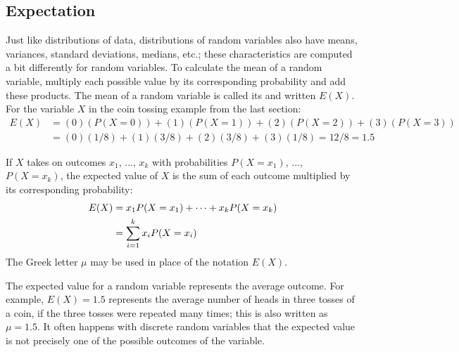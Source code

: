 \subsection{Expectation}


Just like distributions of data, distributions of random variables also have means, variances, standard deviations, medians, etc.; these characteristics are computed a bit differently for random variables. To calculate the mean of a random variable, multiply each possible value by its corresponding probability and add these products. The mean of a random variable is called its  and written $E(X)$. For the variable $X$ in the coin tossing example from the last section:
\vspace{0mm}
\begin{align*}
E(X) &= (0)(P(X=0)) + (1)(P(X=1)) + (2)(P(X=2)) + (3)(P(X = 3)) \\
	&= (0)(1/8) + (1)(3/8) + (2)(3/8) + (3)(1/8) = 12/8 = 1.5
\end{align*}

\begin{termBox}{
If $X$ takes on outcomes $x_1$, ..., $x_k$ with probabilities $P(X=x_1)$, ..., $P(X=x_k)$, the expected value of $X$ is the sum of each outcome multiplied by its corresponding probability:
\begin{align}
E(X) 	&= x_1 P(X=x_1) + \cdots + x_k P(X=x_k) \notag \\
	&= \sum_{i=1}^{k}x_iP(X=x_i)
\end{align}
The Greek letter $\mu$ may be used in place of the notation $E(X)$.}
\end{termBox}
The expected value for a random variable represents the average outcome. For example, $E(X)=1.5$ represents the average number of heads in three tosses of a coin, if the three tosses were repeated many times; this is also written as $\mu=1.5$.  It often happens with discrete random variables that the expected value is not precisely one of the possible outcomes of the variable.

